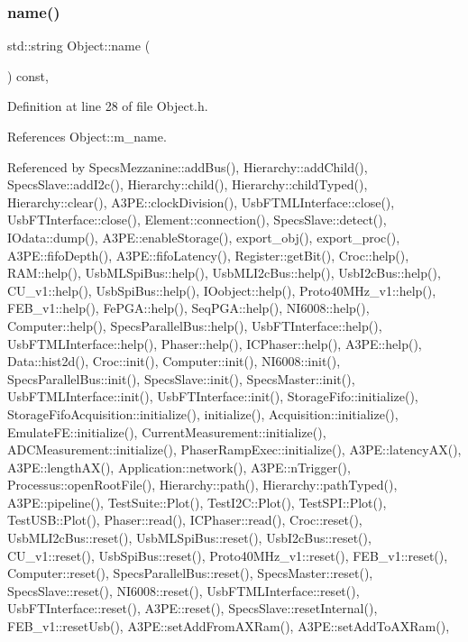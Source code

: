 \subsubsection{\texorpdfstring{name()}{name()}}
{\footnotesize\ttfamily std\+::string Object\+::name (\begin{DoxyParamCaption}{ }\end{DoxyParamCaption}) const\hspace{0.3cm}{\ttfamily [inline]}, {\ttfamily [inherited]}}



Definition at line 28 of file Object.\+h.



References Object\+::m\+\_\+name.



Referenced by Specs\+Mezzanine\+::add\+Bus(), Hierarchy\+::add\+Child(), Specs\+Slave\+::add\+I2c(), Hierarchy\+::child(), Hierarchy\+::child\+Typed(), Hierarchy\+::clear(), A3\+P\+E\+::clock\+Division(), Usb\+F\+T\+M\+L\+Interface\+::close(), Usb\+F\+T\+Interface\+::close(), Element\+::connection(), Specs\+Slave\+::detect(), I\+Odata\+::dump(), A3\+P\+E\+::enable\+Storage(), export\+\_\+obj(), export\+\_\+proc(), A3\+P\+E\+::fifo\+Depth(), A3\+P\+E\+::fifo\+Latency(), Register\+::get\+Bit(), Croc\+::help(), R\+A\+M\+::help(), Usb\+M\+L\+Spi\+Bus\+::help(), Usb\+M\+L\+I2c\+Bus\+::help(), Usb\+I2c\+Bus\+::help(), C\+U\+\_\+v1\+::help(), Usb\+Spi\+Bus\+::help(), I\+Oobject\+::help(), Proto40\+M\+Hz\+\_\+v1\+::help(), F\+E\+B\+\_\+v1\+::help(), Fe\+P\+G\+A\+::help(), Seq\+P\+G\+A\+::help(), N\+I6008\+::help(), Computer\+::help(), Specs\+Parallel\+Bus\+::help(), Usb\+F\+T\+Interface\+::help(), Usb\+F\+T\+M\+L\+Interface\+::help(), Phaser\+::help(), I\+C\+Phaser\+::help(), A3\+P\+E\+::help(), Data\+::hist2d(), Croc\+::init(), Computer\+::init(), N\+I6008\+::init(), Specs\+Parallel\+Bus\+::init(), Specs\+Slave\+::init(), Specs\+Master\+::init(), Usb\+F\+T\+M\+L\+Interface\+::init(), Usb\+F\+T\+Interface\+::init(), Storage\+Fifo\+::initialize(), Storage\+Fifo\+Acquisition\+::initialize(), initialize(), Acquisition\+::initialize(), Emulate\+F\+E\+::initialize(), Current\+Measurement\+::initialize(), A\+D\+C\+Measurement\+::initialize(), Phaser\+Ramp\+Exec\+::initialize(), A3\+P\+E\+::latency\+A\+X(), A3\+P\+E\+::length\+A\+X(), Application\+::network(), A3\+P\+E\+::n\+Trigger(), Processus\+::open\+Root\+File(), Hierarchy\+::path(), Hierarchy\+::path\+Typed(), A3\+P\+E\+::pipeline(), Test\+Suite\+::\+Plot(), Test\+I2\+C\+::\+Plot(), Test\+S\+P\+I\+::\+Plot(), Test\+U\+S\+B\+::\+Plot(), Phaser\+::read(), I\+C\+Phaser\+::read(), Croc\+::reset(), Usb\+M\+L\+I2c\+Bus\+::reset(), Usb\+M\+L\+Spi\+Bus\+::reset(), Usb\+I2c\+Bus\+::reset(), C\+U\+\_\+v1\+::reset(), Usb\+Spi\+Bus\+::reset(), Proto40\+M\+Hz\+\_\+v1\+::reset(), F\+E\+B\+\_\+v1\+::reset(), Computer\+::reset(), Specs\+Parallel\+Bus\+::reset(), Specs\+Master\+::reset(), Specs\+Slave\+::reset(), N\+I6008\+::reset(), Usb\+F\+T\+M\+L\+Interface\+::reset(), Usb\+F\+T\+Interface\+::reset(), A3\+P\+E\+::reset(), Specs\+Slave\+::reset\+Internal(), F\+E\+B\+\_\+v1\+::reset\+Usb(), A3\+P\+E\+::set\+Add\+From\+A\+X\+Ram(), A3\+P\+E\+::set\+Add\+To\+A\+X\+Ram(), 